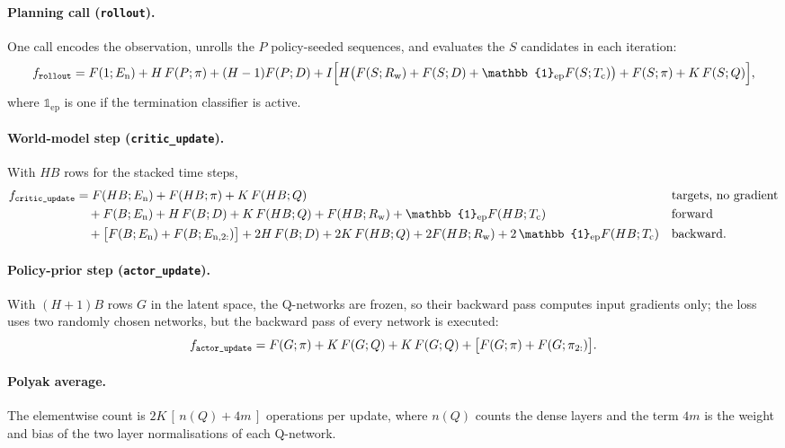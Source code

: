 \paragraph{Planning call (\texttt{rollout}).} One call encodes the observation, unrolls the $P$ policy-seeded sequences, and evaluates the $S$ candidates in each iteration:
\begingroup\small
\begin{equation}
  f_{\texttt{rollout}} = F(1;E_\mathrm{n}) + H\,F(P;\pi) + (H-1)F(P;D) + I\Bigl[H\bigl(F(S;R_\mathrm{w})+F(S;D)+\mathbb{1}_{\mathrm{ep}}F(S;T_\mathrm{c})\bigr)+F(S;\pi)+K\,F(S;Q)\Bigr] ,
  \label{eq:app-plan}
\end{equation}
\endgroup
where $\mathbb{1}_{\mathrm{ep}}$ is one if the termination classifier is active.

\paragraph{World-model step (\texttt{critic\_\allowbreak update}).} With $HB$ rows for the stacked time steps,
\begingroup\small
\begin{align}
  f_{\texttt{critic\_\allowbreak update}} &= F(HB;E_\mathrm{n}) + F(HB;\pi) + K\,F(HB;Q) && \text{targets, no gradient}\notag\\
  &\quad + F(B;E_\mathrm{n}) + H\,F(B;D) + K\,F(HB;Q) + F(HB;R_\mathrm{w}) + \mathbb{1}_{\mathrm{ep}}F(HB;T_\mathrm{c}) && \text{forward}\notag\\
  &\quad + \bigl[F(B;E_\mathrm{n})+F(B;E_{\mathrm{n},2:})\bigr] + 2H\,F(B;D) + 2K\,F(HB;Q) + 2F(HB;R_\mathrm{w}) + 2\,\mathbb{1}_{\mathrm{ep}}F(HB;T_\mathrm{c}) && \text{backward.}
  \label{eq:app-wm}
\end{align}
\endgroup

\paragraph{Policy-prior step (\texttt{actor\_\allowbreak update}).} With $(H+1)B$ rows $G$ in the latent space, the Q-networks are frozen, so their backward pass computes input gradients only; the loss uses two randomly chosen networks, but the backward pass of every network is executed:
\begingroup\small
\begin{equation}
  f_{\texttt{actor\_\allowbreak update}} = F(G;\pi) + K\,F(G;Q) + K\,F(G;Q) + \bigl[F(G;\pi)+F(G;\pi_{2:})\bigr] .
  \label{eq:app-prior}
\end{equation}
\endgroup

\paragraph{Polyak average.} The elementwise count is $2K\,[\,n(Q)+4m\,]$ operations per update, where $n(Q)$ counts the dense layers and the term $4m$ is the weight and bias of the two layer normalisations of each Q-network.

